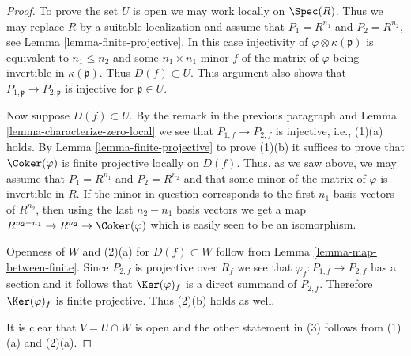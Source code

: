\begin{proof}
To prove the set $U$ is open we may work locally on
$\Spec(R)$. Thus we may replace $R$ by a suitable localization
and assume that $P_1 = R^{n_1}$ and $P_2 = R^{n_2}$, see Lemma
\ref{lemma-finite-projective}. In this case injectivity of
$\varphi \otimes \kappa(\mathfrak p)$ is equivalent to $n_1 \leq n_2$
and some $n_1 \times n_1$ minor $f$ of the matrix of $\varphi$ being
invertible in $\kappa(\mathfrak p)$. Thus $D(f) \subset U$.
This argument also shows that $P_{1, \mathfrak p} \to P_{2, \mathfrak p}$
is injective for $\mathfrak p \in U$.

\medskip\noindent
Now suppose $D(f) \subset U$. By the remark in the previous paragraph
and Lemma \ref{lemma-characterize-zero-local} we see that
$P_{1, f} \to P_{2, f}$ is injective, i.e., (1)(a) holds.
By Lemma \ref{lemma-finite-projective} to prove (1)(b)
it suffices to prove that $\Coker(\varphi)$ is finite projective
locally on $D(f)$. Thus, as we saw above, we may
assume that $P_1 = R^{n_1}$ and $P_2 = R^{n_2}$
and that some minor of the matrix of $\varphi$ is invertible in $R$.
If the minor in question corresponds to the first $n_1$
basis vectors of $R^{n_2}$, then using the last $n_2 - n_1$ basis
vectors we get a map $R^{n_2 - n_1} \to R^{n_2} \to \Coker(\varphi)$
which is easily seen to be an isomorphism.

\medskip\noindent
Openness of $W$ and (2)(a) for $D(f) \subset W$ follow from
Lemma \ref{lemma-map-between-finite}. Since $P_{2, f}$ is projective
over $R_f$ we see that $\varphi_f : P_{1, f} \to P_{2, f}$ has a section
and it follows that $\Ker(\varphi)_f$ is a direct summand of $P_{2, f}$.
Therefore $\Ker(\varphi)_f$ is finite projective. Thus (2)(b) holds as well.

\medskip\noindent
It is clear that $V = U \cap W$ is open and the other statement in (3)
follows from (1)(a) and (2)(a).
\end{proof}







